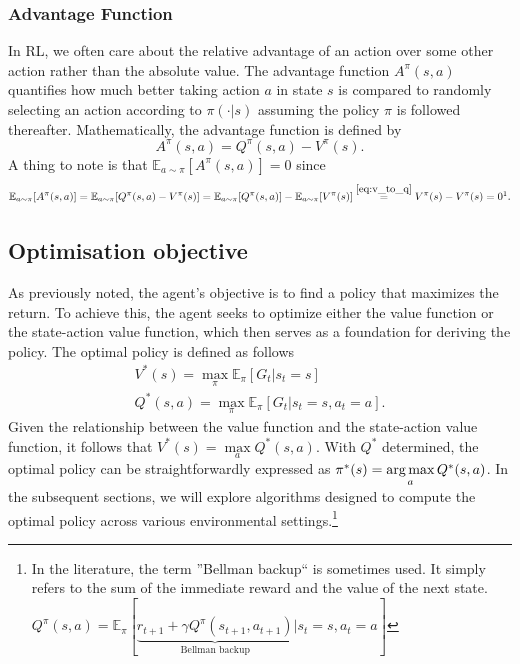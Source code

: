 \subsubsection{Advantage Function}\label{advantage_function}
In RL, we often care about the relative advantage of an action over some other action rather than the absolute value. 
The advantage function $A^\pi(s,a)$ quantifies how much better taking action $a$ in state $s$ is compared to randomly 
selecting an action according to $\pi(\cdot|s)$ assuming the policy $\pi$ is followed thereafter. Mathematically, 
the advantage function is defined by
$$A^\pi(s,a) = Q^\pi(s,a)- V^\pi(s).$$
A thing to note is that $\mathbb{E}_{a\sim\pi}[A^\pi(s,a)]=0$ since 
$$\mathbb{E}_{a\sim\pi}[A^\pi(s,a)] = \mathbb{E}_{a\sim\pi}[Q^\pi(s,a)- V^\pi(s)] = 
\mathbb{E}_{a\sim\pi}[Q^\pi(s,a)]- \mathbb{E}_{a\sim\pi}[V^\pi(s)] \overset{\eqref{eq:v_to_q}}{=} V^\pi(s) - V^\pi(s) = 0 \footnotemark.
$$
\vspace{-0.5cm}
\subsection{Optimisation objective}
As previously noted, the agent's objective is to find a policy that maximizes the return. To achieve this, the 
agent seeks to optimize either the value function or the state-action value function, which then serves as a 
foundation for deriving the policy. The optimal policy is defined as follows
\begin{gather*}
V^{*}(s) = \max_{\pi} \mathbb{E}_{\pi}\left[G_t | s_t = s\right]\\
Q^*(s,a) = \max_{\pi} \mathbb{E}_{\pi}\left[G_t | s_t = s, a_t = a\right].
\end{gather*}
Given the relationship between the value function and the state-action value function, it follows that $V^{*}(s) = 
\max\limits_{a}Q^{*}(s,a)$. With $Q^*$ determined, the optimal policy can be straightforwardly expressed as $\pi^*
(s) = \operatorname*{arg\,max}\limits_{a}Q^{*}(s,a)$. In the subsequent sections, we will explore algorithms designed to compute 
the optimal policy across various environmental settings.\footnote{ In the literature, the term ''Bellman 
backup`` is sometimes used. It simply refers to the sum of the immediate reward and the value of the next state. 
$Q^{\pi}(s,a) =  \mathbb{E}_{\pi}[\underbrace{r_{t+1}+ \gamma Q^{\pi}(s_{t+1},a_{t+1})}_{\text{Bellman backup}} | 
s_t=s,a_t=a] $}

